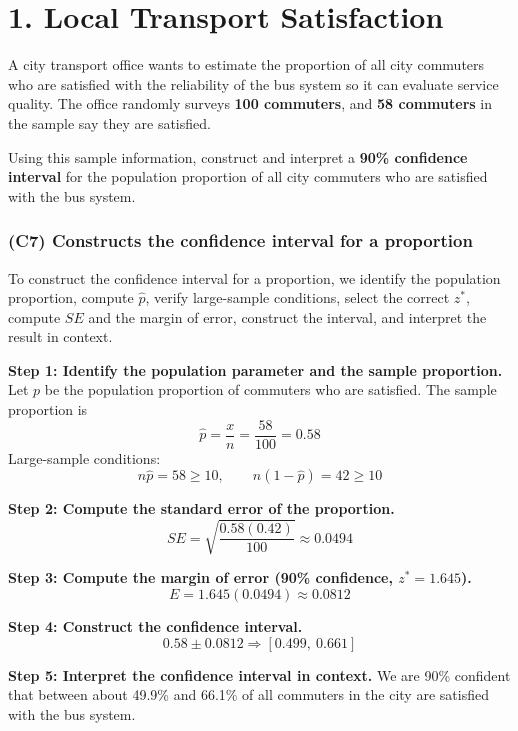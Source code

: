 

	
\section*{1. Local Transport Satisfaction}

A city transport office wants to estimate the proportion of all city commuters who are satisfied with the reliability of the bus system so it can evaluate service quality. The office randomly surveys \textbf{100 commuters}, and \textbf{58 commuters} in the sample say they are satisfied.

Using this sample information, construct and interpret a \textbf{90\% confidence interval} for the population proportion of all city commuters who are satisfied with the bus system.
	
	\subsubsection*{(C7) Constructs the confidence interval for a proportion}
	To construct the confidence interval for a proportion, we identify the population proportion, compute \(\hat{p}\), verify large-sample conditions, select the correct \(z^*\), compute \(SE\) and the margin of error, construct the interval, and interpret the result in context.
	
	\textbf{Step 1: Identify the population parameter and the sample proportion.}
	Let \(p\) be the population proportion of commuters who are satisfied. The sample proportion is
	\[
	\hat{p} = \frac{x}{n} = \frac{58}{100} = 0.58
	\]
	Large-sample conditions:
	\[
	n\hat{p} = 58 \ge 10, \qquad n(1-\hat{p}) = 42 \ge 10
	\]
	
	\textbf{Step 2: Compute the standard error of the proportion.}
	\[
	SE = \sqrt{\frac{0.58(0.42)}{100}} \approx 0.0494
	\]
	
	\textbf{Step 3: Compute the margin of error (90\% confidence, \(z^* = 1.645\)).}
	\[
	E = 1.645(0.0494) \approx 0.0812
	\]
	
	\textbf{Step 4: Construct the confidence interval.}
	\[
	0.58 \pm 0.0812 \Rightarrow [0.499,\ 0.661]
	\]
	
	\textbf{Step 5: Interpret the confidence interval in context.}
	We are 90\% confident that between about 49.9\% and 66.1\% of all commuters in the city are satisfied with the bus system.
	
